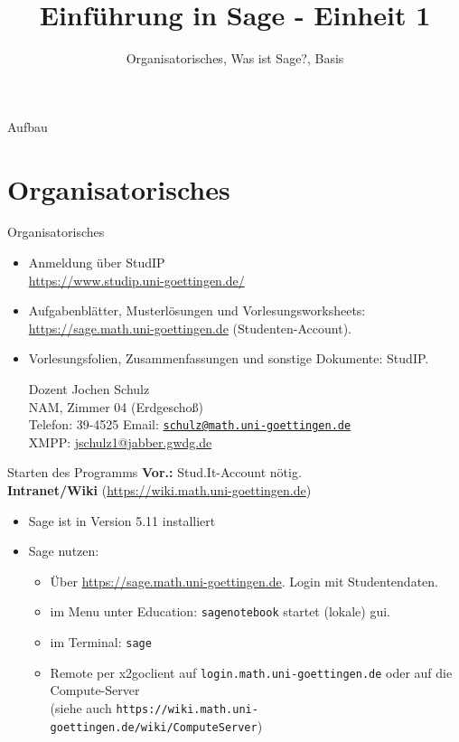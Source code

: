 \documentclass[hyperref={xetex}]{beamer}
\title{Einführung in Sage - Einheit 1}
\subtitle{Organisatorisches, Was ist Sage?, Basis}
\begin{document}
\titlepage

\begin{frame}{Aufbau}
    \tableofcontents
\end{frame}

\section*{Organisatorisches}

\begin{frame}{Organisatorisches}
\begin{itemize}
\item Anmeldung über StudIP \\
      \url{https://www.studip.uni-goettingen.de/}

{\color{blue}{Einführung in Sage (Mathematische Anwendersysteme) (WS 2013/2014)}}
\item Aufgabenblätter, Musterlösungen und Vorlesungsworksheets: \url{https://sage.math.uni-goettingen.de} (Studenten-Account).
\item Vorlesungsfolien, Zusammenfassungen und sonstige Dokumente: StudIP. 
\pause
\begin{block}{Dozent}
Jochen Schulz\\
NAM, Zimmer 04 (Erdgescho{\ss})\\
Telefon: 39-4525
Email: \href{mailto:schulz@math.uni-goettingen.de}{\texttt{schulz@math.uni-goettingen.de}}\\
XMPP: \url{jschulz1@jabber.gwdg.de}\\

\end{block}
\end{itemize}
\end{frame}

\begin{frame}{Starten des Programms}
\textbf{Vor.:} \alert{Stud.It-Account} nötig. \\
\textbf{Intranet/Wiki} (\url{https://wiki.math.uni-goettingen.de})
\begin{itemize}
\item Sage ist in Version 5.11 installiert
\item Sage nutzen: 
\begin{itemize}
\item Über \url{https://sage.math.uni-goettingen.de}. Login mit Studentendaten.
\item im Menu unter Education: \texttt{sagenotebook} startet (lokale) gui.\\
\item im Terminal: \texttt{sage}
\item Remote per \alert{x2goclient}
auf \texttt{login.math.uni-goettingen.de} oder auf die Compute-Server \\
(siehe auch \texttt{https://wiki.math.uni-goettingen.de/wiki/ComputeServer})
\end{itemize}
\end{itemize}
\end{frame}
\end{document}
